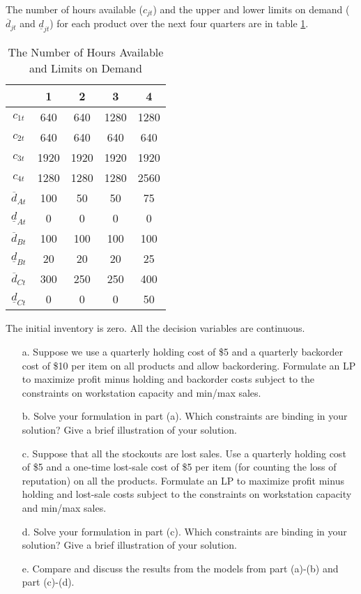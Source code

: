 \documentclass[12pt]{article}
\begin{document}
	\noindent The number of hours available ($c_{jt}$) and the upper and lower limits on demand ($\overline{d}_{jt}$ and $\underline{d}_{jt}$) for each product over the next four quarters are in table \ref{tab9}.
	\begin{table}[H]
		\centering
		\setlength{\belowcaptionskip}{0.1cm}
		\caption{The Number of Hours Available and Limits on Demand}
		\label{tab9}
		\begin{tabular}{ccccc}
			\hline
			\hline
			&1&2&3&4\\
			\hline
			$c_{1t}$&640&640&1280&1280\\
			$c_{2t}$&640&640&640&640\\
			$c_{3t}$&1920&1920&1920&1920\\
			$c_{4t}$&1280&1280&1280&2560\\
			$\overline{d}_{At}$&100&50&50&75\\
			$\underline{d}_{At}$&0&0&0&0\\
			$\overline{d}_{Bt}$&100&100&100&100\\
			$\underline{d}_{Bt}$&20&20&20&25\\
			$\overline{d}_{Ct}$&300&250&250&400\\
			$\underline{d}_{Ct}$&0&0&0&50\\
			\hline
			\hline
		\end{tabular}
	\end{table}

	\noindent The initial inventory is zero. All the decision variables are continuous.
	\begin{enumerate}
		\item[a.]Suppose we use a quarterly holding cost of \$5 and a quarterly backorder cost of \$10 per item on all products and allow backordering. Formulate an LP to maximize profit minus holding and backorder costs subject to the constraints on workstation capacity and min/max sales.
		\item[b.] Solve your formulation in part (a). Which constraints are binding in your solution? Give a brief illustration of your solution.
		\item[c.] Suppose that all the stockouts are lost sales. Use a quarterly holding cost of \$5 and a one-time lost-sale cost of \$5 per item (for counting the loss of reputation) on all the products. Formulate an LP to maximize profit minus holding and lost-sale costs subject to the constraints on workstation capacity and min/max sales.
		\item[d.] Solve your formulation in part (c). Which constraints are binding in your solution? Give a brief illustration of your solution.
		\item[e.] Compare and discuss the results from the models from part (a)-(b) and part (c)-(d).

	\end{enumerate}
\end{document}

